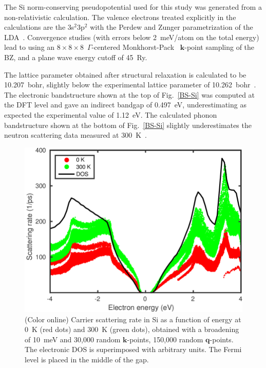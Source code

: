 \documentclass[final,3p,times,twocolumn]{elsarticle}
\begin{document}
The Si norm-conserving pseudopotential used for this study was generated from a non-relativistic calculation. The valence electrons treated explicitly in the calculations are the 3s$^{2}$3p$^2$ with the Perdew and Zunger parametrization of the LDA~\cite{Perdew1981}.
Convergence studies (with errors below 2~meV/atom on the total energy) lead to using an $8\times8\times8$~$\Gamma$-centered Monkhorst-Pack~\cite{Monkhorst1976} $\mathbf{k}$-point sampling of the BZ, and a plane wave energy cutoff of 45~Ry. 


The lattice parameter obtained after structural relaxation is calculated to be 10.207~bohr, slightly below the experimental lattice parameter of 10.262~bohr~\cite{OMara1990}. 
The electronic bandstructure shown at the top of Fig.~\ref{BS-Si} was computed at the DFT level and gave an indirect bandgap of 0.497~eV,  underestimating as expected the experimental value of 1.12~eV.
The calculated phonon bandstructure shown at the bottom of Fig.~\ref{BS-Si} slightly underestimates the neutron scattering data measured at 300~K~\cite{Dolling1963, Nilsson1972}.

\begin{figure}[t!]
  \centering
  \includegraphics[width=0.99\linewidth]{Si_scattering3.png}
  \caption{\label{scatering-Si} (Color online) Carrier scattering rate in Si as a function of energy at 0~K (red dots) and 300~K (green dots), obtained with a broadening of 10~meV and 30,000 random $\mathbf{k}$-points, 150,000 random $\mathbf{q}$-points. The electronic DOS is superimposed with arbitrary units. The Fermi level is placed in the middle of the gap.}
\end{figure}
\end{document}
